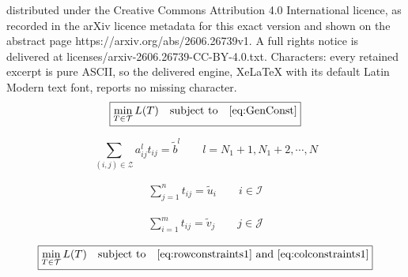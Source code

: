 \documentclass[10pt,a4paper]{amsart}
\begin{document}
distributed under the Creative Commons Attribution 4.0 International licence, as recorded in the arXiv licence metadata for this exact version and shown on the abstract page https://arxiv.org/abs/2606.26739v1. A full rights notice is delivered at licenses/arxiv-2606.26739-CC-BY-4.0.txt. Characters: every retained excerpt is pure ASCII, so the delivered engine, XeLaTeX with its default Latin Modern text font, reports no missing character.
\begin{equation}
\label{eq:GenOpt2}
\fbox{$\displaystyle
\min_{T \in \mathcal{T}} L(T)\quad  \text{subject to} \quad \eqref{eq:GenConst} 
$}
\end{equation}

\begin{equation}
\label{eq:GenConst}
\sum_{(i,j) \in \mathcal Z} a^l_{ij}t_{ij} = \tilde{b}^l
\qquad l=N_1+1, N_1+2, \cdots, N
\end{equation}

\begin{align}
\label{eq:rowconstraints1}
\sum_{j=1}^nt_{ij}  = \tilde{u}_i  \qquad i \in \mathcal{I}
\end{align}

\begin{align}
\label{eq:colconstraints1}
\sum_{i=1}^m t_{ij} = \tilde{v}_j  \qquad j \in \mathcal{J} 
\end{align}

\begin{equation}
\label{eq:GenOpt}
\fbox{$\displaystyle
\min_{T \in \mathcal{T}} L(T)\quad  \text{subject to} \quad \eqref{eq:rowconstraints1} \text{ and } \eqref{eq:colconstraints1}
$}
\end{equation}
\end{document}
